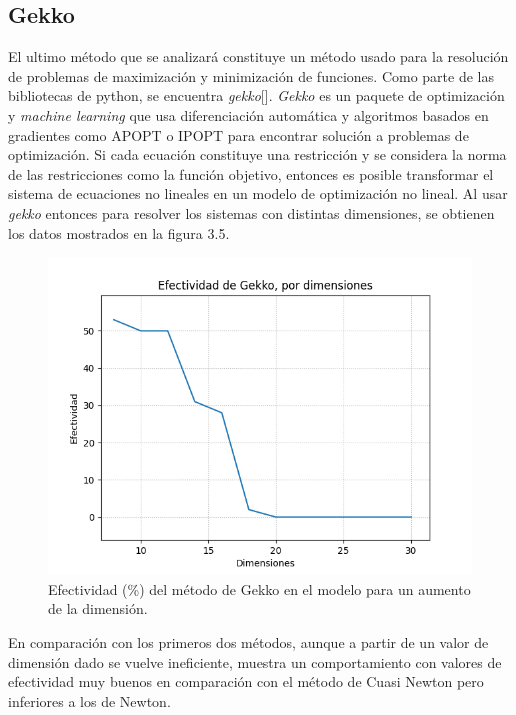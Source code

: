 \subsection{Gekko}

\par El ultimo m\'etodo que se analizar\'a constituye un m\'etodo usado para la resoluci\'on de problemas de maximizaci\'on y minimizaci\'on de funciones. Como parte de las bibliotecas de python, se encuentra \textit{gekko}[\cite{13}]. \textit{Gekko} es un paquete de optimizaci\'on y \textit{machine learning} que usa diferenciaci\'on autom\'atica y algoritmos basados en gradientes como APOPT o IPOPT para encontrar soluci\'on a problemas de optimizaci\'on. Si cada ecuaci\'on constituye una restricci\'on y se considera la norma de las restricciones como la funci\'on objetivo, entonces es posible transformar el sistema de ecuaciones no lineales en un modelo de optimizaci\'on no lineal. Al usar \textit{gekko} entonces para resolver los sistemas con distintas dimensiones, se obtienen los datos mostrados en la figura 3.5.\\

\begin{figure}[h]
\center
\includegraphics[scale=.4]{Graphics/Gekko.png}
\caption{Efectividad (\%) del m\'etodo de Gekko en el modelo para un aumento de la dimensi\'on.}
\end{figure}

\par En comparaci\'on con los primeros dos m\'etodos, aunque a partir de un valor de dimensi\'on dado se vuelve ineficiente, muestra un comportamiento con valores de efectividad muy buenos en comparaci\'on con el m\'etodo de Cuasi Newton pero inferiores a los de Newton.


